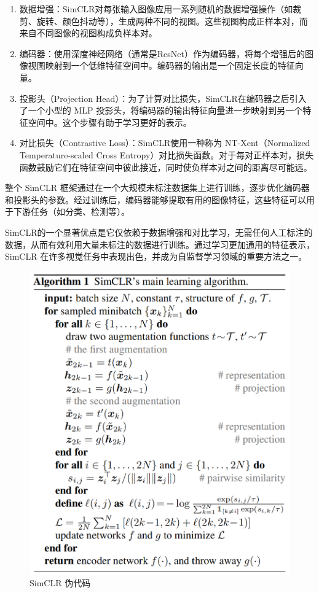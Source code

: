 \documentclass[notitlepage,cs4size,punct,oneside]{ctexrep}
\numberwithin{equation}{chapter}
\theoremstyle{mystyle}
\begin{document}
\begin{enumerate}
\item 数据增强：SimCLR对每张输入图像应用一系列随机的数据增强操作（如裁剪、旋转、颜色抖动等），生成两种不同的视图。这些视图构成正样本对，而来自不同图像的视图构成负样本对。

\item 编码器：使用深度神经网络（通常是ResNet）作为编码器，将每个增强后的图像视图映射到一个低维特征空间中。编码器的输出是一个固定长度的特征向量。

\item 投影头（Projection Head）：为了计算对比损失，SimCLR在编码器之后引入了一个小型的 MLP 投影头，将编码器的输出特征向量进一步映射到另一个特征空间中。这个步骤有助于学习更好的表示。

\item 对比损失（Contrastive Loss）：SimCLR使用一种称为 NT-Xent（Normalized Temperature-scaled Cross Entropy）对比损失函数。对于每对正样本对，损失函数鼓励它们在特征空间中彼此接近，同时使负样本对之间的距离尽可能远。
\end{enumerate}

整个 SimCLR 框架通过在一个大规模未标注数据集上进行训练，逐步优化编码器和投影头的参数。经过训练后，编码器能够提取有用的图像特征，这些特征可以用于下游任务（如分类、检测等）。

SimCLR的一个显著优点是它仅依赖于数据增强和对比学习，无需任何人工标注的数据，从而有效利用大量未标注的数据进行训练。通过学习更加通用的特征表示，SimCLR 在许多视觉任务中表现出色，并成为自监督学习领域的重要方法之一。
\begin{figure}[H]
    \centering
    \includegraphics[scale=0.6]{simclr_code.png}
    \caption{SimCLR 伪代码}
\end{figure}
\end{document}
